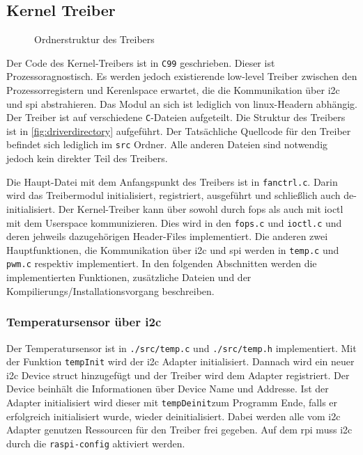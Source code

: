 \subsection{Kernel Treiber}

\begin{wrapfigure}[23]{o}[1cm]{8cm}
\caption{Ordnerstruktur des Treibers}
\label{fig:driverdirectory}
\end{wrapfigure}

Der Code des Kernel-Treibers ist in \texttt{C99} geschrieben.
Dieser ist Prozessoragnostisch.
Es werden jedoch existierende low-level Treiber zwischen den Prozessorregistern und Kerenlspace erwartet, die die Kommunikation über \gls{i2c} und \gls{spi} abstrahieren.
Das Modul an sich ist lediglich von linux-Headern abhängig.
Der Treiber ist auf verschiedene \texttt{C}-Dateien aufgeteilt.
Die Struktur des Treibers ist in \autoref{fig:driverdirectory} aufgeführt.
Der Tatsächliche Quellcode für den Treiber befindet sich lediglich im \texttt{src} Ordner.
Alle anderen Dateien sind notwendig jedoch kein direkter Teil des Treibers.

Die Haupt-Datei mit dem Anfangspunkt des Treibers ist in \texttt{fanctrl.c}.
Darin wird das Treibermodul initialisiert, registriert, ausgeführt und schließlich auch de-initialisiert.
Der Kernel-Treiber kann über sowohl durch \gls{fops} als auch mit \gls{ioctl} mit dem Userspace kommunizieren.
Dies wird in den \texttt{fops.c} und \texttt{ioctl.c} und deren jehweils dazugehörigen Header-Files implementiert.
Die anderen zwei Hauptfunktionen, die Kommunikation über \gls{i2c} und \gls{spi} werden in \texttt{temp.c} und \texttt{pwm.c} respektiv implementiert.
In den folgenden Abschnitten werden die implementierten Funktionen, zusätzliche Dateien und der Kompilierungs/Installationsvorgang beschreiben.

\subsubsection{Temperatursensor über \acrshort{i2c}}

Der Temperatursensor ist in \texttt{./src/temp.c} und \texttt{./src/temp.h} implementiert.
Mit der Funktion \texttt{tempInit} wird der \gls{i2c} Adapter initialisiert.
Dannach wird ein neuer \gls{i2c} Device struct hinzugefügt und der Treiber wird dem Adapter registriert.
Der Device beinhält die Informationen über Device Name und Addresse.
Ist der Adapter initialisiert wird dieser mit \texttt{tempDeinit}zum Programm Ende, falls er erfolgreich initialisiert wurde, wieder deinitialisiert.
Dabei werden alle vom \gls{i2c} Adapter genutzen Ressourcen für den Treiber frei gegeben.
Auf dem \gls{rpi} muss \gls{i2c} durch die \texttt{raspi-config} aktiviert werden.

